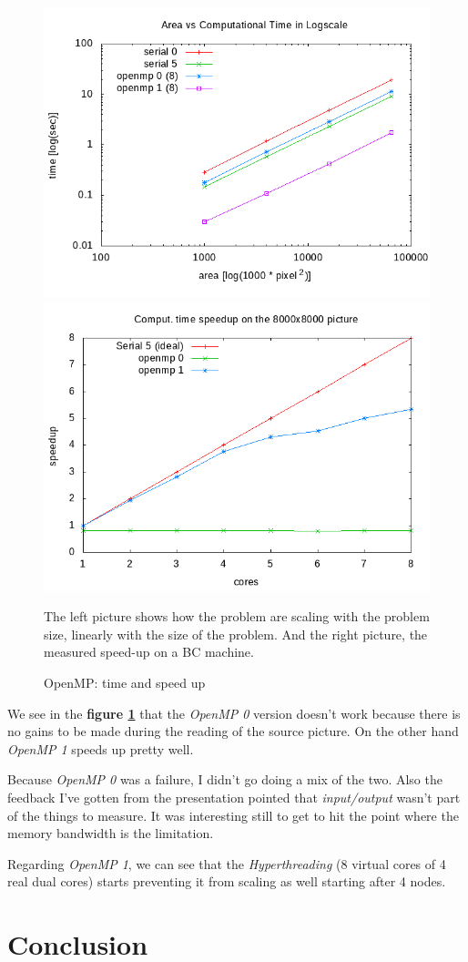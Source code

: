 \documentclass[10pt,a4paper]{article}
\begin{document}
\begin{figure}[ht]
    \begin{center}
        \includegraphics[width=.45\linewidth]{../../plots/areatime_compute_log_omp.png}
        \includegraphics[width=.45\linewidth]{../../plots/omp_speedup_compute_8000.png}
    \end{center}
    \caption{OpenMP: time and speed up}{The left picture shows how the problem
    are scaling with the problem size, linearly with the size of the problem.
    And the right picture, the measured speed-up on a BC machine.}
    \label{fig:omp}
\end{figure}

We see in the \textbf{figure \ref{fig:omp}} that the \emph{OpenMP 0} version
doesn't work because there is no gains to be made during the reading of the
source picture. On the other hand \emph{OpenMP 1} speeds up pretty well.

Because \emph{OpenMP 0} was a failure, I didn't go doing a mix of the two. Also
the feedback I've gotten from the presentation pointed that \emph{input/output}
wasn't part of the things to measure. It was interesting still to get to hit the
point where the memory bandwidth is the limitation.

Regarding \emph{OpenMP 1}, we can see that the \emph{Hyperthreading} (8 virtual
cores of 4 real dual cores) starts preventing it from scaling as well starting
after 4 nodes.


\section{Conclusion}
\end{document}
